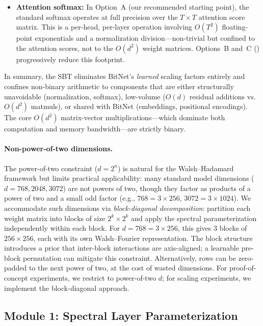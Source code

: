 \documentclass[12pt,a4paper]{article}
\theoremstyle{plain}
\theoremstyle{definition}
\theoremstyle{remark}
\begin{document}
\begin{itemize}
    \item \textbf{Attention softmax:} In Option~A (our recommended starting point), the standard softmax operates at full precision over the $T \times T$ attention score matrix. This is a per-head, per-layer operation involving $O(T^2)$ floating-point exponentials and a normalization division---non-trivial but confined to the attention scores, not to the $O(d^2)$ weight matrices. Options~B and~C () progressively reduce this footprint.
\end{itemize}
In summary, the SBT eliminates BitNet's \emph{learned} scaling factors entirely and confines non-binary arithmetic to components that are either structurally unavoidable (normalization, softmax), low-volume ($O(d)$ residual additions vs.\ $O(d^2)$ matmuls), or shared with BitNet (embeddings, positional encodings). The core $O(d^2)$ matrix-vector multiplications---which dominate both computation and memory bandwidth---are strictly binary.

\paragraph{Non-power-of-two dimensions.}
The power-of-two constraint ($d = 2^n$) is natural for the Walsh--Hadamard framework but limits practical applicability: many standard model dimensions ($d = 768, 2048, 3072$) are not powers of two, though they factor as products of a power of two and a small odd factor (e.g., $768 = 3 \times 256$, $3072 = 3 \times 1024$).
We accommodate such dimensions via \emph{block-diagonal decomposition}: partition each weight matrix into blocks of size $2^k \times 2^k$ and apply the spectral parameterization independently within each block.
For $d = 768 = 3 \times 256$, this gives 3 blocks of $256 \times 256$, each with its own Walsh--Fourier representation.
The block structure introduces a prior that inter-block interactions are axis-aligned; a learnable pre-block permutation can mitigate this constraint.
Alternatively, rows can be zero-padded to the next power of two, at the cost of wasted dimensions.
For proof-of-concept experiments, we restrict to power-of-two $d$; for scaling experiments, we implement the block-diagonal approach.


\subsection{Module 1: Spectral Layer Parameterization}\label{sec:spectral-param}
\end{document}
